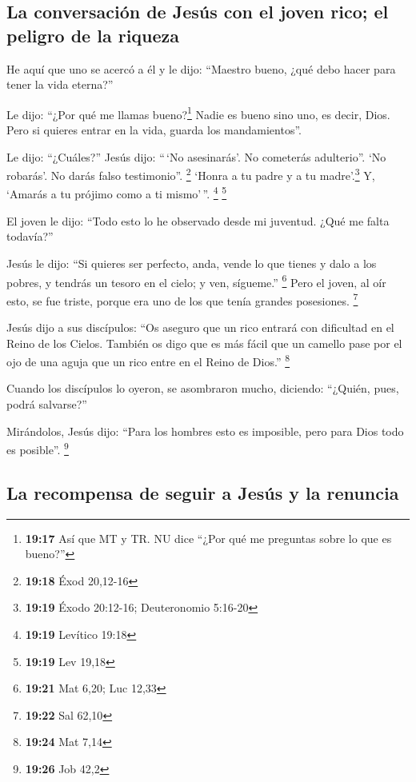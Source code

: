 \hypertarget{la-conversaciuxf3n-de-jesuxfas-con-el-joven-rico-el-peligro-de-la-riqueza}{%
\subsection{La conversación de Jesús con el joven rico; el peligro de la
riqueza}\label{la-conversaciuxf3n-de-jesuxfas-con-el-joven-rico-el-peligro-de-la-riqueza}}

 He aquí que uno se acercó a él y le dijo: ``Maestro
bueno, ¿qué debo hacer para tener la vida eterna?''

 Le dijo: ``¿Por qué me llamas bueno?\footnote{\textbf{19:17}
  Así que MT y TR. NU dice ``¿Por qué me preguntas sobre lo que es
  bueno?''} Nadie es bueno sino uno, es decir, Dios. Pero si quieres
entrar en la vida, guarda los mandamientos''.

 Le dijo: ``¿Cuáles?'' Jesús dijo: ``\,`No asesinarás'.
No cometerás adulterio''. `No robarás'. No darás falso testimonio''.
\footnote{\textbf{19:18} Éxod 20,12-16}  `Honra a tu
padre y a tu madre'.\footnote{\textbf{19:19} Éxodo 20:12-16;
  Deuteronomio 5:16-20} Y, `Amarás a tu prójimo como a ti mismo'\,''.
\footnote{\textbf{19:19} Levítico 19:18} \footnote{\textbf{19:19} Lev
  19,18}

 El joven le dijo: ``Todo esto lo he observado desde mi
juventud. ¿Qué me falta todavía?''

 Jesús le dijo: ``Si quieres ser perfecto, anda, vende lo
que tienes y dalo a los pobres, y tendrás un tesoro en el cielo; y ven,
sígueme.'' \footnote{\textbf{19:21} Mat 6,20; Luc 12,33} 
Pero el joven, al oír esto, se fue triste, porque era uno de los que
tenía grandes posesiones. \footnote{\textbf{19:22} Sal 62,10}

 Jesús dijo a sus discípulos: ``Os aseguro que un rico
entrará con dificultad en el Reino de los Cielos. 
También os digo que es más fácil que un camello pase por el ojo de una
aguja que un rico entre en el Reino de Dios.'' \footnote{\textbf{19:24}
  Mat 7,14}

 Cuando los discípulos lo oyeron, se asombraron mucho,
diciendo: ``¿Quién, pues, podrá salvarse?''

 Mirándolos, Jesús dijo: ``Para los hombres esto es
imposible, pero para Dios todo es posible''. \footnote{\textbf{19:26}
  Job 42,2}

\hypertarget{la-recompensa-de-seguir-a-jesuxfas-y-la-renuncia}{%
\subsection{La recompensa de seguir a Jesús y la
renuncia}\label{la-recompensa-de-seguir-a-jesuxfas-y-la-renuncia}}

